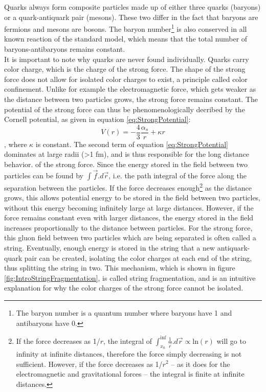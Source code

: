 Quarks always form composite particles made up of either three quarks (baryons) or a quark-antiquark pair (mesons). These two differ in the fact that baryons are fermions and mesons are bosons. The baryon number\footnote{The baryon number is a quantum number where baryons have 1 and antibaryons have 0.} is also conserved in all known reaction of the standard model, which means that the total number of baryons-antibaryons remains constant. \\
It is important to note why quarks are never found individually. Quarks carry color charge, which is the charge of the strong force. The shape of the strong force does not allow for isolated color charges to exist, a principle called  color confinement. Unlike for example the electromagnetic force, which gets weaker as the distance between two particles grows, the strong force remains constant. The potential of the strong force can thus be phenomenologically decribed by the Cornell potential\cite{Strong_potential}, as given in equation \ref{eq:StrongPotential}:
\begin{equation}\label{eq:StrongPotential}
    V(r) = -\frac{4}{3}\frac{\alpha_s}{r}+\kappa r
\end{equation}
, where $\kappa$ is constant. The second term of equation \ref{eq:StrongPotential} dominates at large radii (>1 fm), and is thus responsible for the long distance behavior. of the strong force. Since the energy stored in the field between two particles can be found by $\int \vec{f}.d\vec{r}$, i.e. the path integral of the force along the separation between the particles. If the force decreases enough\footnote{If the force decreases as 1/$r$, the integral of $\int_{x_0}^{\inf} \frac{1}{\vec{r} } .d\vec{r} \propto \mathrm{ln}(r)$ will go to infinity at infinite distances, therefore the force simply decreasing is not sufficient. However, if the force decreases as 1/$r^2$ -- as it does for the electromagnetic and gravitational forces -- the integral is finite at infinite distances.} as the distance grows, this allows potential energy to be stored in the field between two particles, without this energy becoming infinitely large at large distances. However, if the force remains constant even with larger distances, the energy stored in the field increases proportionally to the distance between particles. For the strong force, this gluon field between two particles which are being separated is often called a string. Eventually, enough energy is stored in the string that a new antiquark-quark pair can be created, isolating the color charges at each end of the string, thus splitting the string in two. This mechanism, which is shown in figure \ref{fig:IntroStringFragmentation}, is called string fragmentation, and is an intuitive explanation for why the color charges of the strong force cannot be isolated. \\

